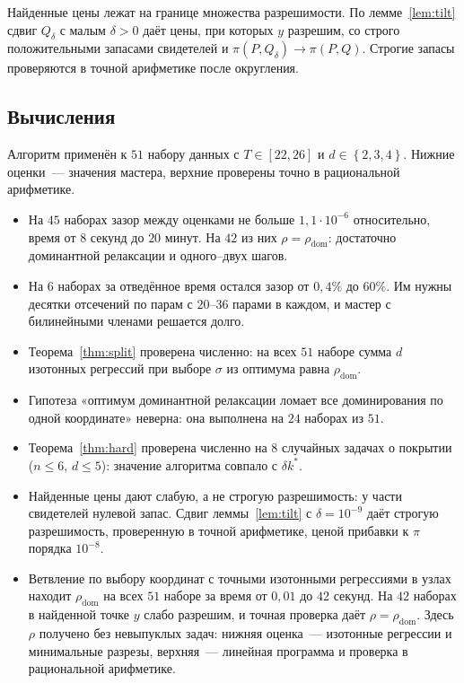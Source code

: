 \documentclass[a4paper,11pt]{article}
\theoremstyle{plain}
\theoremstyle{definition}
\theoremstyle{remark}
\newcommand{\set}[1]{\left\{ #1 \right\}}
\begin{document}
Найденные цены лежат на границе множества разрешимости. По лемме~\ref{lem:tilt} сдвиг $Q_\delta$ с малым $\delta>0$ даёт цены, при которых $y$ разрешим, со строго положительными запасами свидетелей и $\pi(P,Q_\delta)\to\pi(P,Q)$. Строгие запасы проверяются в точной арифметике после округления.

\subsection{Вычисления}

Алгоритм применён к $51$ набору данных с $T\in[22,26]$ и $d\in\set{2,3,4}$. Нижние оценки~--- значения мастера, верхние проверены точно в рациональной арифметике.
\begin{itemize}
    \item На $45$ наборах зазор между оценками не больше $1{,}1\cdot10^{-6}$ относительно, время от $8$ секунд до $20$ минут. На $42$ из них $\rho=\rho_{\mathrm{dom}}$: достаточно доминантной релаксации и одного–двух шагов.
    \item На $6$ наборах за отведённое время остался зазор от $0{,}4\%$ до $60\%$. Им нужны десятки отсечений по парам с $20$--$36$ парами в каждом, и мастер с билинейными членами решается долго.
    \item Теорема~\ref{thm:split} проверена численно: на всех $51$ наборе сумма $d$ изотонных регрессий при выборе $\sigma$ из оптимума равна $\rho_{\mathrm{dom}}$.
    \item Гипотеза «оптимум доминантной релаксации ломает все доминирования по одной координате» неверна: она выполнена на $24$ наборах из $51$.
    \item Теорема~\ref{thm:hard} проверена численно на $8$ случайных задачах о покрытии ($n\le6$, $d\le5$): значение алгоритма совпало с $\delta k^*$.
    \item Найденные цены дают слабую, а не строгую разрешимость: у части свидетелей нулевой запас. Сдвиг леммы~\ref{lem:tilt} с $\delta=10^{-9}$ даёт строгую разрешимость, проверенную в точной арифметике, ценой прибавки к $\pi$ порядка $10^{-8}$.
    \item Ветвление по выбору координат с точными изотонными регрессиями в узлах находит $\rho_{\mathrm{dom}}$ на всех $51$ наборе за время от $0{,}01$ до $42$ секунд. На $42$ наборах в найденной точке $y$ слабо разрешим, и точная проверка даёт $\rho=\rho_{\mathrm{dom}}$. Здесь $\rho$ получено без невыпуклых задач: нижняя оценка~--- изотонные регрессии и минимальные разрезы, верхняя~--- линейная программа и проверка в рациональной арифметике.

\end{itemize}
\end{document}

